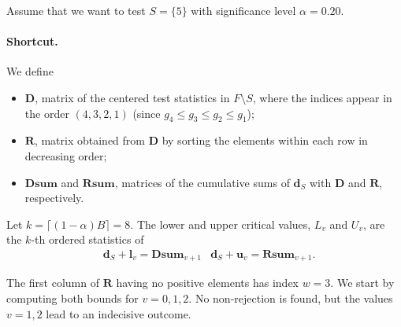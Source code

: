 \documentclass[11pt,a4paper,openright,twoside]{article}
\begin{document}
Assume that we want to test $S=\{5\}$ with significance level $\alpha=0.20$.




\paragraph{Shortcut.}
\begin{table}[h!]
\centering
{}
\caption{Supersets of $S=\{5\}$by size. The sets in bold are used to define the lower critical value $L_v$.}
\end{table}

We define
\begin{itemize}
\item $\mathbf{D}$, matrix of the centered test statistics in $F\setminus S$, where the indices appear in the order $(4,3,2,1)$ (since $g_4\leq g_3\leq g_2\leq g_1$);
\item $\mathbf{R}$, matrix obtained from $\mathbf{D}$ by sorting the elements within each row in decreasing order;
\item $\mathbf{Dsum}$ and $\mathbf{Rsum}$, matrices of the cumulative sums of $\mathbf{d}_S$ with $\mathbf{D}$ and $\mathbf{R}$, respectively.
\end{itemize}

Let $k=\lceil (1-\alpha) B\rceil =8$. The lower and upper critical values, $L_v$ and $U_v$, are the $k$-th ordered statistics of
\begin{align*}
& \mathbf{d}_S +\mathbf{l}_{v}=\mathbf{Dsum}_{v+1} & \mathbf{d}_S + \mathbf{u}_v=\mathbf{Rsum}_{v+1}.
\end{align*}

The first column of $\mathbf{R}$ having no positive elements has index $w=3$. We start by computing both bounds for $v=0,1,2$. No non-rejection is found, but the values $v=1,2$ lead to an indecisive outcome.
\end{document}

